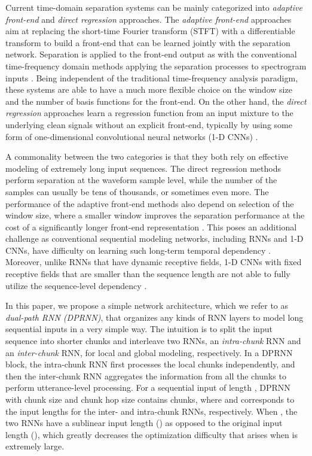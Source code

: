 \documentclass{article}
\begin{document}
Current time-domain separation systems can be mainly categorized into \textit{adaptive front-end} and \textit{direct regression} approaches. The \textit{adaptive front-end} approaches aim at replacing the short-time Fourier transform (STFT) with a differentiable transform to build a front-end that can be learned jointly with the separation network. Separation is applied to the front-end output as with the conventional time-frequency domain methods applying the separation processes to spectrogram inputs \cite{venkataramani2018end, luo2019conv, shi2019furcanext}. Being independent of the traditional time-frequency analysis paradigm, these systems are able to have a much more flexible choice on the window size and the number of basis functions for the front-end. On the other hand, the \textit{direct regression} approaches learn a regression function from an input mixture to the underlying clean signals without an explicit front-end, typically by using some form of one-dimensional convolutional neural networks (1-D CNNs) \cite{stoller2018wave, lluis2018end, fu2018end}.

A commonality between the two categories is that they both rely on effective modeling of
extremely long input sequences. The direct regression methods perform separation at the waveform sample level, while the number of the samples can usually be tens of thousands, or sometimes even more. The performance of the adaptive front-end methods also depend on selection of the window size, where a smaller window improves the separation performance at the cost of a significantly longer front-end representation \cite{luo2019conv, kavalerov2019universal}. This poses an additional challenge as conventional sequential modeling networks, including RNNs and 1-D CNNs,  have difficulty on learning such long-term temporal dependency \cite{li2018independently}. Moreover, unlike RNNs that have dynamic receptive fields, 1-D CNNs with fixed receptive fields that are smaller than the sequence length are not able to fully utilize the sequence-level dependency \cite{bai2018empirical}.

In this paper, we propose a simple network architecture, which we refer to as \textit{dual-path RNN (DPRNN)}, that organizes any kinds of RNN layers to model long sequential inputs in a very simple way. The intuition is to split the input sequence into shorter chunks and interleave two RNNs, an \textit{intra-chunk} RNN and an \textit{inter-chunk} RNN, for local and global modeling, respectively. In a DPRNN block, the intra-chunk RNN first processes the local chunks independently, and then the inter-chunk RNN aggregates the information from all the chunks to perform utterance-level processing. For a sequential input of length , DPRNN with chunk size  and chunk hop size  contains  chunks, where  and  corresponds to the input lengths for the inter- and intra-chunk RNNs, respectively. When , the two RNNs have a sublinear input length () as opposed to the original input length (), which greatly decreases the optimization difficulty that arises when  is extremely large.
\end{document}
